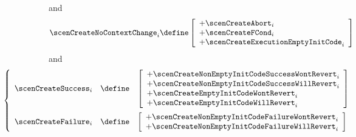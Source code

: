 and
\[
	\scenCreateNoContextChange_{i} \define
	\left[ \begin{array}{l}
		+ \scenCreateAbort                    _{i}  \\
		+ \scenCreateFCond                    _{i}  \\
		+ \scenCreateExecutionEmptyInitCode   _{i}  \\
	\end{array} \right]
\]
and
\[
	\hspace*{-2cm}
	\left\{ \begin{array}{lcl}
		\scenCreateSuccess_{i} & \define &
		\left[ \begin{array}{l}
			+ \scenCreateNonEmptyInitCodeSuccessWontRevert   _{i}   \\
			+ \scenCreateNonEmptyInitCodeSuccessWillRevert   _{i}   \\
			+ \scenCreateEmptyInitCodeWontRevert             _{i}   \\
			+ \scenCreateEmptyInitCodeWillRevert             _{i}   \\
		\end{array} \right]
		\vspace{2mm} \\
		\scenCreateFailure_{i} & \define &
		\left[ \begin{array}{l}
			+ \scenCreateNonEmptyInitCodeFailureWontRevert   _{i}   \\
			+ \scenCreateNonEmptyInitCodeFailureWillRevert   _{i}   \\
		\end{array} \right]
	\end{array} \right.
\]
